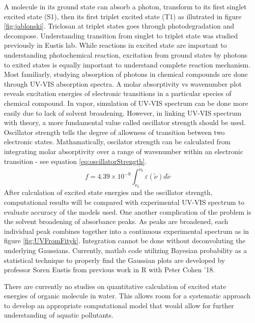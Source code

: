 \documentclass[
journal=jpcbfk, %
manuscript=article]{achemso}
\begin{document}
A molecule in its ground state can absorb a photon, transform to its first singlet excited state (S1), then its first triplet excited state (T1) as illutrated in figure \ref{fig:jablonski}. Triclosan at triplet states goes through photodegradation and decompose. Understanding transition from singlet to triplet state was studied previously in Eustis lab.\cite{Ricke2014} While reactions in excited state are important to understanding photochemical reaction, excitation from ground states by photons to exited states is equally important to understand complete reaction mechanism. Most familiarly, studying absorption of photons in chemical compounds are done through UV-VIS absorption spectra. A molar absorptivity vs wavenumber plot reveals excitation energies of electronic transitions in a particular species of chemical compound. In vapor, simulation of UV-VIS spectrum can be done more easily due to lack of solvent broadening.\cite{Hirayama2010} However, in linking UV-VIS spectrum with theory, a more fundamental value called oscillator strength should be used. Oscillator strength tells the degree of allowness of transition between two electronic states. Mathamatically, oscilator strength can be calculated from integrating molar absorptivity over a range of wavenumber within an electronic transition - see equation \ref{eq:oscillatorStrength}.
\begin{equation}
\label{eq:oscillatorStrength}
f = 4.39\times 10^{-9}\int_{\widetilde{\nu}_{a}}^{\widetilde{\nu}_{b}}\varepsilon(\widetilde{\nu}) d\widetilde{\nu}
\end{equation}
After calculation of excited state energies and the oscillator strength, computational results will be compared with experimental UV-VIS spectrum to evaluate accuracy of the models used. One another complication of the problem is the solvent broadening of absorbance peaks. As peaks are broadened, each individual peak combines together into a continuous experimental spectrum as in figure \ref{fig:UVFromFityk}. Integration cannot be done without deconvoluting the underlying Gaussians. Currently, matlab code utilizing Bayesian probability as a statistical technique to properly find the Gaussian plots are developed by professor Soren Eustis from previous work in R with Peter Cohen '18.

 There are currently no studies on quantitative calculation of excited state energies of organic molecule in water. This allows room for a systematic approach to develop an appropriate computational model that would allow for further understanding of aquatic pollutants.
\end{document}

